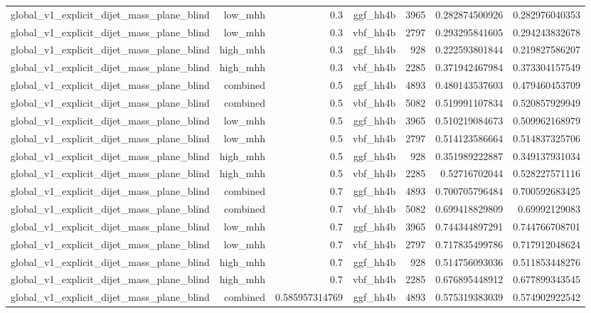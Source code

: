 \begin{table}[htbp]
{\begin{tabular}{lrrrrrr}
global\_v1\_explicit\_dijet\_mass\_plane\_blind & low\_mhh & 0.3 & ggf\_hh4b & 3965 & 0.282874500926 & 0.282976040353 \\
global\_v1\_explicit\_dijet\_mass\_plane\_blind & low\_mhh & 0.3 & vbf\_hh4b & 2797 & 0.293295841605 & 0.294243832678 \\
global\_v1\_explicit\_dijet\_mass\_plane\_blind & high\_mhh & 0.3 & ggf\_hh4b & 928 & 0.222593801844 & 0.219827586207 \\
global\_v1\_explicit\_dijet\_mass\_plane\_blind & high\_mhh & 0.3 & vbf\_hh4b & 2285 & 0.371942467984 & 0.373304157549 \\
global\_v1\_explicit\_dijet\_mass\_plane\_blind & combined & 0.5 & ggf\_hh4b & 4893 & 0.480143537603 & 0.479460453709 \\
global\_v1\_explicit\_dijet\_mass\_plane\_blind & combined & 0.5 & vbf\_hh4b & 5082 & 0.519991107834 & 0.520857929949 \\
global\_v1\_explicit\_dijet\_mass\_plane\_blind & low\_mhh & 0.5 & ggf\_hh4b & 3965 & 0.510219084673 & 0.509962168979 \\
global\_v1\_explicit\_dijet\_mass\_plane\_blind & low\_mhh & 0.5 & vbf\_hh4b & 2797 & 0.514123586664 & 0.514837325706 \\
global\_v1\_explicit\_dijet\_mass\_plane\_blind & high\_mhh & 0.5 & ggf\_hh4b & 928 & 0.351989222887 & 0.349137931034 \\
global\_v1\_explicit\_dijet\_mass\_plane\_blind & high\_mhh & 0.5 & vbf\_hh4b & 2285 & 0.52716702044 & 0.528227571116 \\
global\_v1\_explicit\_dijet\_mass\_plane\_blind & combined & 0.7 & ggf\_hh4b & 4893 & 0.700705796484 & 0.700592683425 \\
global\_v1\_explicit\_dijet\_mass\_plane\_blind & combined & 0.7 & vbf\_hh4b & 5082 & 0.699418829809 & 0.69992129083 \\
global\_v1\_explicit\_dijet\_mass\_plane\_blind & low\_mhh & 0.7 & ggf\_hh4b & 3965 & 0.744344897291 & 0.744766708701 \\
global\_v1\_explicit\_dijet\_mass\_plane\_blind & low\_mhh & 0.7 & vbf\_hh4b & 2797 & 0.717835499786 & 0.717912048624 \\
global\_v1\_explicit\_dijet\_mass\_plane\_blind & high\_mhh & 0.7 & ggf\_hh4b & 928 & 0.514756093036 & 0.511853448276 \\
global\_v1\_explicit\_dijet\_mass\_plane\_blind & high\_mhh & 0.7 & vbf\_hh4b & 2285 & 0.676895448912 & 0.677899343545 \\
global\_v1\_explicit\_dijet\_mass\_plane\_blind & combined & 0.585957314769 & ggf\_hh4b & 4893 & 0.575319383039 & 0.574902922542 \\

\end{tabular}}
\end{table}
